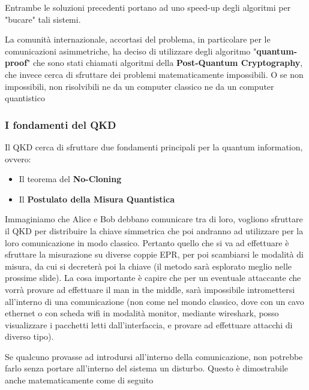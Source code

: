 Entrambe le soluzioni precedenti portano ad uno speed-up degli algoritmi per "bucare" tali sistemi. 

\begin{warn}
La comunità internazionale, accortasi del problema, in particolare per le comunicazioni asimmetriche, ha deciso di utilizzare degli algoritmo "\textbf{quantum-proof}" che sono stati chiamati algoritmi della \textbf{Post-Quantum Cryptography}, che invece cerca di sfruttare dei problemi matematicamente impossibili. O se non impossibili, non risolvibili ne da un computer classico ne da un computer quantistico
\end{warn}

\subsubsection{I fondamenti del QKD}
Il QKD cerca di sfruttare due fondamenti principali per la quantum information, ovvero:
\begin{itemize}
    \item Il teorema del \textbf{No-Cloning}
    \item Il \textbf{Postulato della Misura Quantistica}
\end{itemize}

Immaginiamo che Alice e Bob debbano comunicare tra di loro, vogliono sfruttare il QKD per distribuire la chiave simmetrica che poi andranno ad utilizzare per la loro comunicazione in modo classico. Pertanto quello che si va ad effettuare è sfruttare la misurazione su diverse coppie EPR, per poi scambiarsi le modalità di misura, da cui si decreterà poi la chiave (il metodo sarà esplorato meglio nelle prossime slide). La cosa importante è capire che per un eventuale attaccante che vorrà provare ad effettuare il man in the middle, sarà impossibile intromettersi all'interno di una comunicazione (non come nel mondo classico, dove con un cavo ethernet o con scheda wifi in modalità monitor, mediante wireshark, posso visualizzare i pacchetti letti dall'interfaccia, e provare ad effettuare attacchi di diverso tipo).

Se qualcuno provasse ad introdursi all'interno della comunicazione, non potrebbe farlo senza portare all'interno del sistema un disturbo. Questo è dimostrabile anche matematicamente come di seguito

